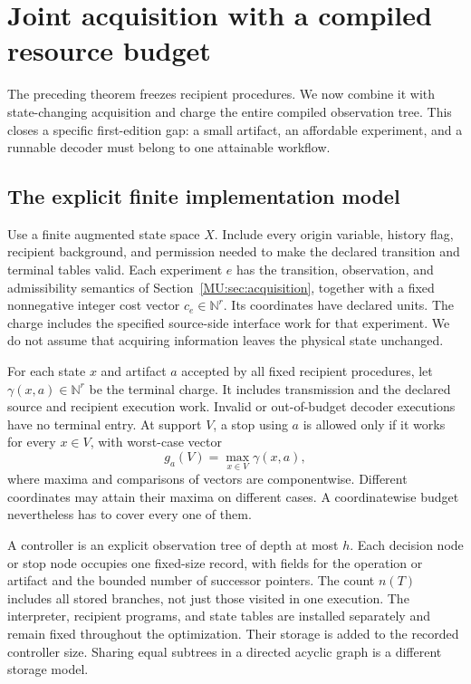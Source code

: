 \section{Joint acquisition with a compiled resource budget}\label{MU:sec:budgeted-synthesis}
The preceding theorem freezes recipient procedures. We now combine it with state-changing acquisition and charge the entire compiled observation tree. This closes a specific first-edition gap: a small artifact, an affordable experiment, and a runnable decoder must belong to one attainable workflow.

\subsection{The explicit finite implementation model}
Use a finite augmented state space $X$. Include every origin variable, history flag, recipient background, and permission needed to make the declared transition and terminal tables valid. Each experiment $e$ has the transition, observation, and admissibility semantics of Section~\ref{MU:sec:acquisition}, together with a fixed nonnegative integer cost vector $c_e\in\mathbb N^r$. Its coordinates have declared units. The charge includes the specified source-side interface work for that experiment. We do not assume that acquiring information leaves the physical state unchanged.

For each state $x$ and artifact $a$ accepted by all fixed recipient procedures, let $\gamma(x,a)\in\mathbb N^r$ be the terminal charge. It includes transmission and the declared source and recipient execution work. Invalid or out-of-budget decoder executions have no terminal entry. At support $V$, a stop using $a$ is allowed only if it works for every $x\in V$, with worst-case vector
\[
g_a(V)=\max_{x\in V}\gamma(x,a),
\]
where maxima and comparisons of vectors are componentwise. Different coordinates may attain their maxima on different cases. A coordinatewise budget nevertheless has to cover every one of them.

A controller is an explicit observation tree of depth at most $h$. Each decision node or stop node occupies one fixed-size record, with fields for the operation or artifact and the bounded number of successor pointers. The count $n(T)$ includes all stored branches, not just those visited in one execution. The interpreter, recipient programs, and state tables are installed separately and remain fixed throughout the optimization. Their storage is added to the recorded controller size. Sharing equal subtrees in a directed acyclic graph is a different storage model.

